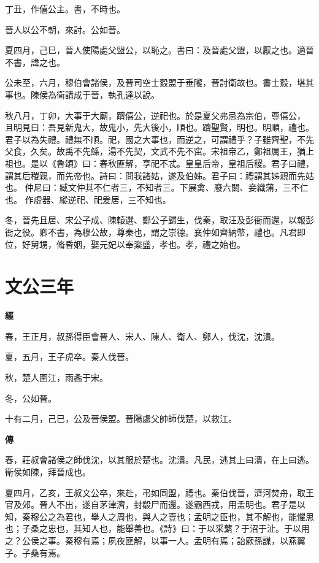 \documentclass{ctexart}
\begin{document}
丁丑，作僖公主。書，不時也。

晉人以公不朝，來討。公如晉。

夏四月，己巳，晉人使陽處父盟公，以恥之。書曰：及晉處父盟，以厭之也。適晉不書，諱之也。

公未至，六月，穆伯會諸侯，及晉司空士縠盟于垂隴，晉討衛故也。書士縠，堪其事也。陳侯為衛請成于晉，執孔達以說。

秋八月，丁卯，大事于大廟，躋僖公，逆祀也。於是夏父弗忌為宗伯，尊僖公，
且明見曰：吾見新鬼大，故鬼小，先大後小，順也。躋聖賢，明也。明順，禮也。君子以為失禮。禮無不順。祀，國之大事也，而逆之，可謂禮乎？子雖齊聖，不先父食，久矣。故禹不先鯀，湯不先契，文武不先不窋。宋祖帝乙，鄭祖厲王，猶上祖也。是以《魯頌》曰：春秋匪解，享祀不忒。皇皇后帝，皇祖后稷。君子曰禮，謂其后稷親，而先帝也。詩曰：問我諸姑，遂及伯姊。君子曰：禮謂其姊親而先姑也。
仲尼曰：臧文仲其不仁者三，不知者三。下展禽、廢六關、妾織蒲，三不仁也。
作虛器、縱逆祀、祀爰居，三不知也。

冬，晉先且居、宋公子成、陳轅選、鄭公子歸生，伐秦，取汪及彭衙而還，以報彭衙之役。卿不書，為穆公故，尊秦也，謂之崇德。襄仲如齊納幣，禮也。凡君即位，好舅甥，脩昏姻，娶元妃以奉粢盛，孝也。孝，禮之始也。





\section{文公三年}


\textbf{經}



春，王正月，叔孫得臣會晉人、宋人、陳人、衛人、鄭人，伐沈，沈潰。

夏，五月，王子虎卒。秦人伐晉。

秋，楚人圍江，雨螽于宋。

冬，公如晉。

十有二月，己巳，公及晉侯盟。晉陽處父帥師伐楚，以救江。

\textbf{傳}



春，莊叔會諸侯之師伐沈，以其服於楚也。沈潰。凡民，逃其上曰潰，在上曰逃。衛侯如陳，拜晉成也。

夏四月，乙亥，王叔文公卒，來赴，弔如同盟，禮也。秦伯伐晉，濟河焚舟，取王官及郊。晉人不出，遂自茅津濟，封殽尸而還。遂霸西戎，用孟明也。君子是以知，秦穆公之為君也，舉人之周也，與人之壹也；孟明之臣也，其不解也，能懼思也；子桑之忠也，其知人也，能舉善也。《詩》曰：于以采蘩？于沼于沚。于以用之？公侯之事。秦穆有焉；夙夜匪解，以事一人。孟明有焉；詒厥孫謀，以燕翼子。子桑有焉。
\end{document}
